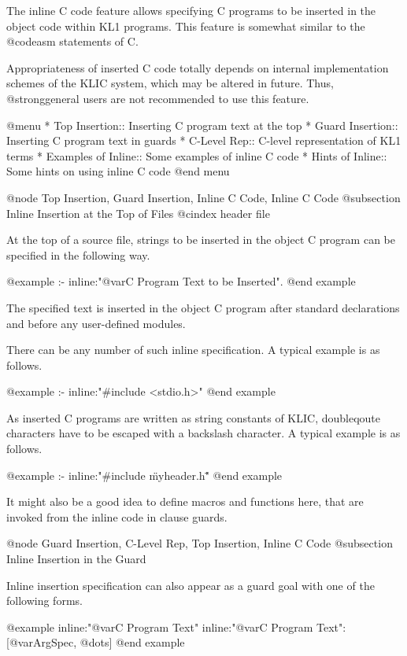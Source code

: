 The inline C code feature allows specifying C programs to be inserted in
the object code within KL1 programs.  This feature is somewhat similar
to the @code{asm} statements of C.

Appropriateness of inserted C code totally depends on internal
implementation schemes of the KLIC system, which may be altered in
future.  Thus, @strong{general users are not recommended to use this
feature.}

@menu
* Top Insertion::               Inserting C program text at the top
* Guard Insertion::             Inserting C program text in guards
* C-Level Rep::                 C-level representation of KL1 terms
* Examples of Inline::          Some examples of inline C code
* Hints of Inline::             Some hints on using inline C code
@end menu

@node Top Insertion, Guard Insertion, Inline C Code, Inline C Code
@subsection Inline Insertion at the Top of Files
@cindex header file

At the top of a source file, strings to be inserted in the object C
program can be specified in the following way.

@example
:- inline:"@var{C Program Text to be Inserted}".
@end example

The specified text is inserted in the object C program after standard
declarations and before any user-defined modules.

There can be any number of such inline specification.  A typical
example is as follows.

@example
:- inline:"#include <stdio.h>"
@end example

As inserted C programs are written as string constants of KLIC,
doubleqoute characters have to be escaped with a backslash character.  A
typical example is as follows.

@example
:- inline:"#include \"myheader.h\""
@end example

It might also be a good idea to define macros and functions here, that
are invoked from the inline code in clause guards.

@node Guard Insertion, C-Level Rep, Top Insertion, Inline C Code
@subsection Inline Insertion in the Guard

Inline insertion specification can also appear as a guard goal with
one of the following forms.

@example
inline:"@var{C Program Text}"
inline:"@var{C Program Text}":[@var{ArgSpec}, @dots{}]
@end example


